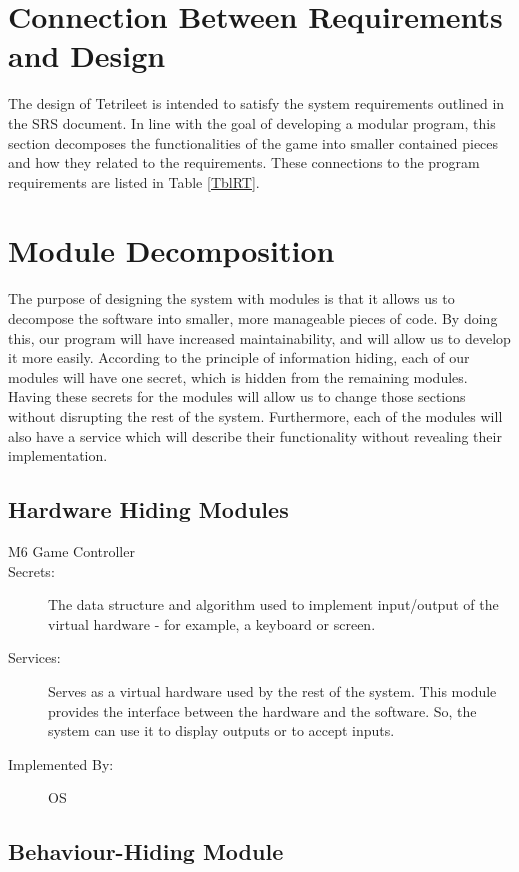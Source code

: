 \documentclass[12pt, titlepage]{article}
\begin{document}
\section{Connection Between Requirements and Design} \label{SecConnection}

The design of Tetrileet is intended to satisfy the system requirements outlined in the SRS document. In line with the goal of developing a modular program, this section decomposes the functionalities of the game into smaller contained pieces and how they related to the requirements. These connections to the program requirements are listed in Table \ref{TblRT}.

\section{Module Decomposition} \label{SecMD}

The purpose of designing the system with modules is that it allows us to decompose the software into smaller, more manageable pieces of code. By doing this, our program will have increased maintainability, and will allow us to develop it more easily. According to the principle of information hiding, each of our modules will have one secret, which is hidden from the remaining modules. Having these secrets for the modules will allow us to change those sections without disrupting the rest of the system. Furthermore, each of the modules will also have a service which will describe their functionality without revealing their implementation.    

\subsection{Hardware Hiding Modules}

\begin{description}
\item[M6 Game Controller]
\item[Secrets:]The data structure and algorithm used to implement input/output of the virtual hardware - for example, a keyboard or screen.
\item[Services:]Serves as a virtual hardware used by the rest of the
  system. This module provides the interface between the hardware and the
  software. So, the system can use it to display outputs or to accept inputs.
\item[Implemented By:] OS
\end{description}

\subsection{Behaviour-Hiding Module}
\end{document}
